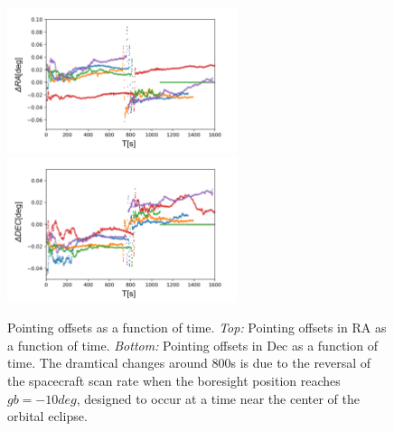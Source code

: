 \documentclass[12pt, preprint]{aastex61}
\begin{document}
\begin{figure}[p]
\begin{center}
\includegraphics[width=0.6\textwidth]{figures/all-ra-new}
\includegraphics[width=0.6\textwidth]{figures/all-dec-new}
\end{center}
\caption{%
  \label{pointing}
  Pointing offsets as a function of time.
  \emph{Top:}  Pointing offsets in RA as a function of time.
  \emph{Bottom:} Pointing offsets in Dec as a function of time.
  The dramtical changes around 800s is due to the reversal of the spacecraft scan rate when the boresight position reaches $gb=-10 deg$, designed to occur at a time near the center of the orbital eclipse.
  }
\end{figure}
\end{document}
